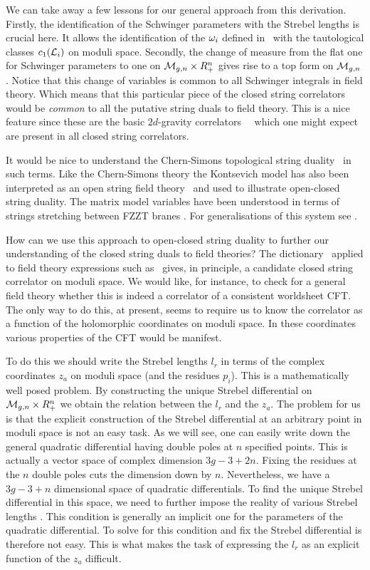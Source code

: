 We can take away a few lessons  for our general 
approach from this derivation. 
Firstly, the identification of the Schwinger parameters 
with the Strebel lengths is crucial here. It allows the identification
of the ${\omega}_i$ defined in \top\ with the tautological classes 
$c_1({\cal L}_i)$ on moduli 
space. Secondly, the change of measure from the flat one for Schwinger 
parameters to one on ${\cal M}_{g,n}\times R_+^n$ gives rise to a 
top form on ${\cal M}_{g,n}$. Notice that this 
change of variables is common to
all Schwinger integrals in field theory. Which 
means that this particular piece of the closed string correlators would be 
{\it common} to all the 
putative string duals to field theory. This is a nice
feature since these are the basic $2d$-gravity correlators \wittop\dist\
\dijkwit\vv\
which one
might expect are present in all closed string correlators. 

It would be nice to understand the Chern-Simons topological string 
duality \gv\ in such terms. Like the Chern-Simons theory
the Kontsevich model has also been interpreted as an open 
string field theory \gr\ and used to illustrate open-closed 
string duality. The matrix model variables have been understood in terms of 
strings stretching between FZZT branes \gr\seib . For generalisations of this 
system see \aki .


How can we use this approach to open-closed string duality to further
our understanding of the closed string duals to field theories? 
The dictionary \dic\ applied to field theory expressions such as 
\schem\ gives, in principle, a candidate closed string correlator on moduli 
space. We would like, for instance, to
check for a general field theory whether this is indeed a 
correlator of a consistent worldsheet CFT. The only way to do this,
at present, seems to require us to know the correlator as a function of the 
holomorphic coordinates on moduli space. In these coordinates various 
properties of the CFT would be manifest. 

To do this we should write the Strebel lengths $l_r$ in terms
of the complex coordinates $z_a$ on moduli space (and the residues $p_i$). 
This is a mathematically well posed problem. By constructing the 
unique Strebel differential on ${\cal M}_{g,n}\times R_+^n$ we obtain
the relation between the $l_r$ and the $z_a$. The problem for us is that 
the explicit construction of the Strebel differential at an arbitrary 
point in moduli space is not an easy task. As we will see, 
one can easily write down the general quadratic differential 
having double poles at $n$ specified points. This is actually 
a vector space 
of complex dimension $3g-3+2n$. Fixing the residues at the $n$
double poles cuts the dimension down by $n$. Nevertheless, we
have a $3g-3+n$ dimensional space of quadratic differentials. To  
find the unique Strebel differential in this space, 
we need to further impose the reality of various Strebel lengths \strl .
This condition is generally an implicit one for the parameters of the
quadratic differential. To solve for this condition and fix the Strebel 
differential is therefore not easy. This is what makes the task of 
expressing the $l_r$ as an explicit function of the $z_a$ difficult.
 
